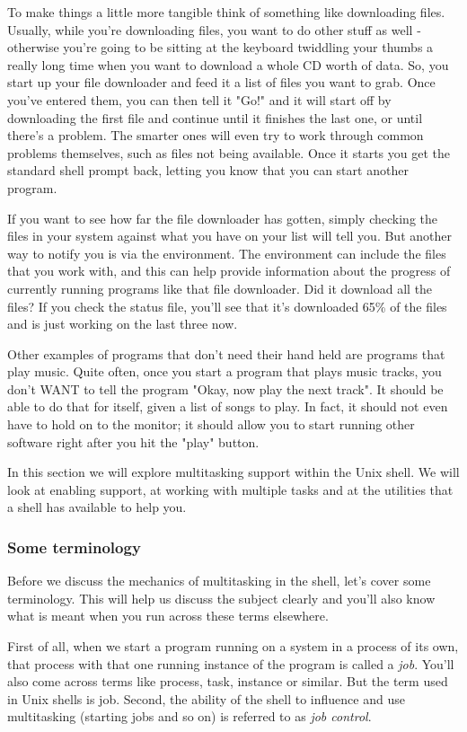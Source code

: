 To make things a little more tangible think of something like downloading
files. Usually, while you're downloading files, you want to do other stuff as
well - otherwise you're going to be sitting at the keyboard twiddling your
thumbs a really long time when you want to download a whole CD worth of data.
So, you start up your file downloader and feed it a list of files you want to
grab. Once you've entered them, you can then tell it "Go!" and it will start
off by downloading the first file and continue until it finishes the last one,
or until there's a problem. The smarter ones will even try to work through
common problems themselves, such as files not being available. Once it starts
you get the standard shell prompt back, letting you know that you can start
another program. 

If you want to see how far the file downloader has gotten, simply checking the
files in your system against what you have on your list will tell you. But
another way to notify you is via the environment. The environment can include
the files that you work with, and this can help provide information about the
progress of currently running programs like that file downloader. Did it
download all the files? If you check the status file, you'll see that it's
downloaded 65\% of the files and is just working on the last three now.

Other examples of programs that don't need their hand held are programs that
play music. Quite often, once you start a program that plays music tracks, you
don't WANT to tell the program "Okay, now play the next track". It should be
able to do that for itself, given a list of songs to play. In fact, it should
not even have to hold on to the monitor; it should allow you to start running
other software right after you hit the "play" button.

In this section we will explore multitasking support within the Unix shell. We
will look at enabling support, at working with multiple tasks and at the
utilities that a shell has available to help you.

\subsubsection{Some terminology} Before we discuss the mechanics of
multitasking in the shell, let's cover some terminology. This will help us
discuss the subject clearly and you'll also know what is meant when you run
across these terms elsewhere.

First of all, when we start a program running on a system in a process of its
own, that process with that one running instance of the program is called a
\textit{job}. You'll also come across terms like process, task, instance or
similar. But the term used in Unix shells is job. Second, the ability of the
shell to influence and use multitasking (starting jobs and so on) is referred
to as \textit{job control}.

